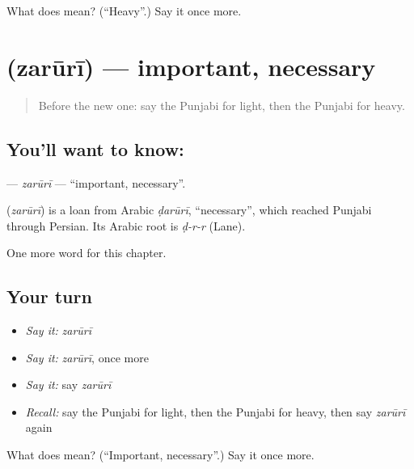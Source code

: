 \begin{tcolorbox}[breakable,colback=teal!4,colframe=teal!35!black,title={Before you move on}]
What does  mean? (\textquotedblleft{}Heavy\textquotedblright{}.) Say it once more.
\end{tcolorbox}
\section[\texorpdfstring{\pa{ਜ਼ਰੂਰੀ} (zarūrī)}{ਜ਼ਰੂਰੀ (zarūrī)}]{ (zarūrī) — important, necessary}

\label{lesson:PA-C83-zaruri}



\begin{quote}
Before the new one: say the Punjabi for light, then the Punjabi for heavy.
\end{quote}

\subsection*{You'll want to know: }
\textbf{} — \emph{zarūrī} — \textquotedblleft{}important, necessary\textquotedblright{}.

\begin{cousinweb}
\textbf{} (\emph{zarūrī}) is a loan from Arabic \emph{ḍarūrī}, \textquotedblleft{}necessary\textquotedblright{}, which reached Punjabi through Persian. Its Arabic root is \emph{ḍ-r-r} (Lane).
\end{cousinweb}

\begin{grammarlens}[title={What you've built}]
One more word for this chapter.
\end{grammarlens}

\subsection*{Your turn}
\begin{itemize}
\raggedright
  \item \emph{Say it:} \emph{zarūrī}
  \item \emph{Say it:} \emph{zarūrī}, once more
  \item \emph{Say it:} say \emph{zarūrī}
  \item \emph{Recall:} say the Punjabi for light, then the Punjabi for heavy, then say \emph{zarūrī} again
\end{itemize}

\begin{tcolorbox}[breakable,colback=teal!4,colframe=teal!35!black,title={Before you move on}]
What does  mean? (\textquotedblleft{}Important, necessary\textquotedblright{}.) Say it once more.
\end{tcolorbox}
